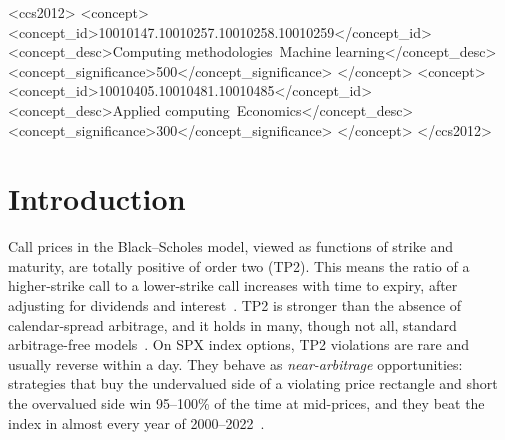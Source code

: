 \documentclass[sigconf,review]{acmart}
\begin{document}
\begin{CCSXML}
<ccs2012>
 <concept>
  <concept_id>10010147.10010257.10010258.10010259</concept_id>
  <concept_desc>Computing methodologies~Machine learning</concept_desc>
  <concept_significance>500</concept_significance>
 </concept>
 <concept>
  <concept_id>10010405.10010481.10010485</concept_id>
  <concept_desc>Applied computing~Economics</concept_desc>
  <concept_significance>300</concept_significance>
 </concept>
</ccs2012>
\end{CCSXML}



\maketitle

\section{Introduction}
\label{sec:intro}

Call prices in the Black--Scholes model, viewed as functions of strike and maturity, are totally positive of order two (TP2). This means the ratio of a higher-strike call to a lower-strike call increases with time to expiry, after adjusting for dividends and interest~\cite{glasserman2026tp2theory}. TP2 is stronger than the absence of calendar-spread arbitrage, and it holds in many, though not all, standard arbitrage-free models~\cite{glasserman2026tp2theory,glasserman2023convexity}. On SPX index options, TP2 violations are rare and usually reverse within a day. They behave as \emph{near-arbitrage} opportunities: strategies that buy the undervalued side of a violating price rectangle and short the overvalued side win 95--100\% of the time at mid-prices, and they beat the index in almost every year of 2000--2022~\cite{glasserman2025tp2}.
\end{document}
